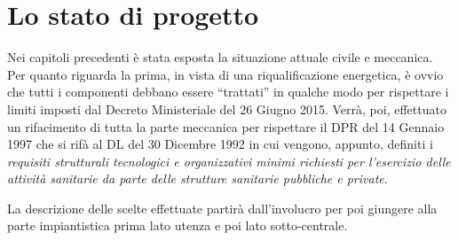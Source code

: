 \chapter{Lo stato di progetto}
\thispagestyle{empty}
Nei capitoli precedenti è stata esposta la situazione attuale civile e meccanica. Per quanto riguarda la prima, in vista di una riqualificazione energetica, è ovvio che tutti i componenti debbano essere ``trattati'' in qualche modo per rispettare i limiti imposti dal Decreto Ministeriale del 26 Giugno 2015. Verrà, poi, effettuato un rifacimento di tutta la parte meccanica per rispettare il DPR del 14 Gennaio 1997 che si rifà al DL del 30 Dicembre 1992 in cui vengono, appunto, definiti i \emph{requisiti strutturali tecnologici e organizzativi minimi richiesti per l'esercizio delle attività sanitarie da parte delle strutture sanitarie pubbliche e private}.

La descrizione delle scelte effettuate partirà dall'involucro per poi giungere alla parte impiantistica prima lato utenza e poi lato sotto-centrale.


